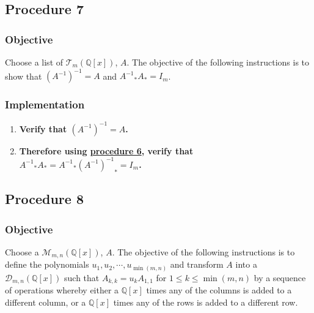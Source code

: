 \documentclass[twocolumn]{article}
\begin{document}
		\subsection{Procedure 7}\label{sec:procedure 7}
			\subsubsection{Objective}
				Choose a list of $\mathcal{T}_{m}(\mathbb{Q}[x])$, $A$. The objective of the following instructions is to show that $(A^{-1})^{-1}=A$ and ${A^{-1}}_*A_*=I_m$.
			\subsubsection{Implementation}
				\begin{enumerate}
					\item \textbf{Verify that $(A^{-1})^{-1}=A$.}
					\item \textbf{Therefore using \hyperref[sec:procedure 6]{procedure 6}, verify that ${A^{-1}}_*A_*={A^{-1}}_*{(A^{-1})^{-1}}_*=I_m$.}
				\end{enumerate}
		\subsection{Procedure 8}\label{sec:procedure 8}
			\subsubsection{Objective}
				Choose a $\mathcal{M}_{m,n}(\mathbb{Q}[x])$, $A$. The objective of the following instructions is to define the polynomials $u_1,u_2,\cdots,u_{\min(m,n)}$ and transform $A$ into a $\mathcal{D}_{m,n}(\mathbb{Q}[x])$ such that $A_{k,k}=u_kA_{1,1}$ for $1\le k\le\min(m,n)$ by a sequence of operations whereby either a $\mathbb{Q}[x]$ times any of the columns is added to a different column, or a $\mathbb{Q}[x]$ times any of the rows is added to a different row.
\end{document}
